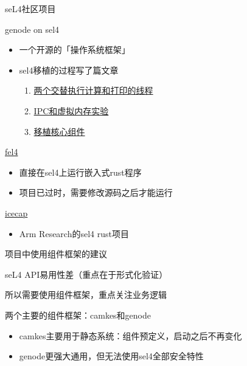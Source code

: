 \documentclass[presentation,dvipdfmx,CJKbookmarks]{beamer}
\begin{document}
\begin{CJK*}{UTF8}{simsun}
\begin{frame}[label={sec:org28d11c9}]{seL4\thinspace 社区项目}
\begin{block}{genode on sel4}
\begin{itemize}
\item 一个开源的「操作系统框架」
\item sel4\thinspace 移植的过程写了\thinspace 篇文章
\begin{enumerate}
\item \href{https://genode.org/documentation/articles/sel4\_part\_1}{两个交替执行计算和打印的线程}
\item \href{https://genode.org/documentation/articles/sel4\_part\_2}{IPC\thinspace 和虚拟内存实验}
\item \href{https://genode.org/documentation/articles/sel4\_part\_3}{移植核心组件}
\end{enumerate}
\end{itemize}
\end{block}
\begin{block}{\href{https://github.com/PolySync/cargo-fel4}{fel4}}
\begin{itemize}
\item 直接在\thinspace sel4\thinspace 上运行嵌入式\thinspace rust\thinspace 程序
\item 项目已过时，需要修改源码之后才能运行
\end{itemize}
\end{block}
\begin{block}{\href{https://gitlab.com/arm-research/security/icecap/icecap/}{icecap}}
\begin{itemize}
\item Arm Research\thinspace 的\thinspace sel4 rust\thinspace 项目
\end{itemize}
\end{block}
\end{frame}

\begin{frame}[label={sec:orgc9b1554}]{项目中使用组件框架的建议}
\begin{block}{seL4 API\thinspace 易用性差（重点在于形式化验证）}
\end{block}
\begin{block}{所以需要使用组件框架，重点关注业务逻辑}
\end{block}
\begin{block}{两个主要的组件框架：camkes\thinspace 和\thinspace genode}
\begin{itemize}
\item camkes\thinspace 主要用于静态系统：组件预定义，启动之后不再变化
\item genode\thinspace 更强大通用，但无法使用\thinspace sel4\thinspace 全部安全特性
\end{itemize}
\end{block}
\end{frame}


\end{CJK*}
\end{document}
